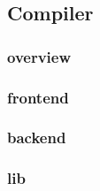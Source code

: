 \subsection{Compiler}\label{section: ola-lang-language-compiler}

\subsubsection{overview}\label{section: overview}


\subsubsection{frontend}\label{section: frontend}


\subsubsection{backend}\label{section: backend}


\subsubsection{lib}\label{section: lib}
